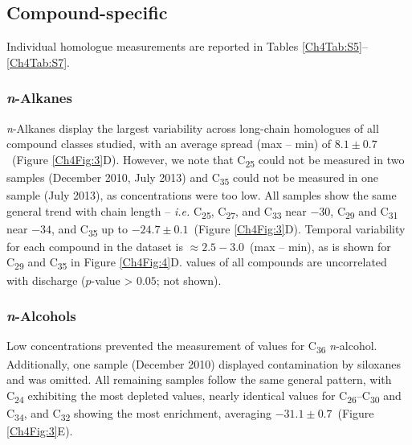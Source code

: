 \subsection{Compound-specific }

Individual homologue  measurements are reported in Tables \ref{Ch4Tab:S5}--\ref{Ch4Tab:S7}.

\subsubsection{\textit{n}-Alkanes}

\textit{n}-Alkanes display the largest  variability across long-chain homologues of all compound classes studied, with an average spread (max -- min) of $8.1 \pm 0.7$\textperthousand\ (Figure \ref{Ch4Fig:3}D). However, we note that C\textsubscript{25} could not be measured in two samples (December 2010, July 2013) and C\textsubscript{35} could not be measured in one sample (July 2013), as concentrations were too low. All samples show the same general trend with chain length -- \textit{i.e.} C\textsubscript{25}, C\textsubscript{27}, and C\textsubscript{33} near $-30$\textperthousand, C\textsubscript{29} and C\textsubscript{31} near $-34$\textperthousand, and C\textsubscript{35} up to $-24.7 \pm 0.1$\textperthousand\ (Figure \ref{Ch4Fig:3}D). Temporal variability for each compound in the dataset is $\approx 2.5 - 3.0$\textperthousand\ (max -- min), as is shown for C\textsubscript{29} and C\textsubscript{35} in Figure \ref{Ch4Fig:4}D.  values of all compounds are uncorrelated with discharge ($p$-value > $0.05$; not shown).

\subsubsection{\textit{n}-Alcohols}

Low concentrations prevented the measurement of  values for C\textsubscript{36} \textit{n}-alcohol. Additionally, one sample (December 2010) displayed contamination by siloxanes and was omitted. All remaining samples follow the same general pattern, with C\textsubscript{24} exhibiting the most depleted values, nearly identical values for C\textsubscript{26}--C\textsubscript{30} and C\textsubscript{34}, and C\textsubscript{32} showing the most enrichment, averaging $-31.1 \pm 0.7$\textperthousand\ (Figure \ref{Ch4Fig:3}E).

